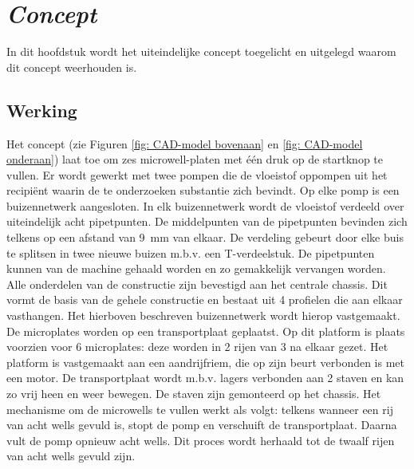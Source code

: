 \documentclass[a4paper,twoside,kulak]{kulakreport} %
\begin{document}
\chapter{\textit{Concept}} 


In dit hoofdstuk wordt het uiteindelijke concept toegelicht en uitgelegd waarom dit concept weerhouden is.

\section{Werking}

	Het concept (zie Figuren \ref{fig: CAD-model bovenaan} en \ref{fig: CAD-model onderaan}) laat toe om zes microwell-platen met één druk op de startknop te vullen. Er wordt gewerkt met twee pompen die de vloeistof oppompen uit het recipiënt waarin de te onderzoeken substantie zich bevindt. Op elke pomp is een buizennetwerk aangesloten. In elk buizennetwerk wordt de vloeistof verdeeld over uiteindelijk acht pipetpunten. De middelpunten van de pipetpunten bevinden zich telkens op een afstand van \SI{9}{mm} van elkaar. De verdeling gebeurt door elke buis te splitsen in twee nieuwe buizen m.b.v. een T-verdeelstuk. De pipetpunten kunnen van de machine gehaald worden en zo gemakkelijk vervangen worden.
	\newline
	Alle onderdelen van de constructie zijn bevestigd aan het centrale chassis. Dit vormt de basis van de gehele constructie en bestaat uit 4 profielen die aan elkaar vasthangen. Het hierboven beschreven buizennetwerk wordt hierop vastgemaakt.
	De microplates worden op een transportplaat geplaatst. Op dit platform is plaats voorzien voor 6 microplates: deze worden in 2 rijen van 3 na elkaar gezet. Het platform is vastgemaakt aan een aandrijfriem, die op zijn beurt verbonden is met een motor. De transportplaat wordt m.b.v. lagers verbonden aan 2 staven en kan zo vrij heen en weer bewegen. De staven zijn gemonteerd op het chassis.
	\newline
	Het mechanisme om de microwells te vullen werkt als volgt: telkens wanneer een rij van acht wells gevuld is, stopt de pomp en verschuift de transportplaat. Daarna vult de pomp opnieuw acht wells. Dit proces wordt herhaald tot de twaalf rijen van acht wells gevuld zijn. 
	
\end{document}

